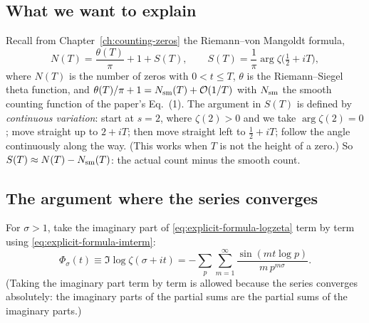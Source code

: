 \subsection{What we want to explain}

Recall from Chapter~\ref{ch:counting-zeros} the Riemann--von Mangoldt formula,
\begin{equation}
N(T)=\frac{\theta(T)}{\pi}+1+S(T),\qquad S(T)=\frac{1}{\pi}\arg\zeta\bigl(\tfrac12+iT\bigr),
\label{eq:explicit-formula-rvm}
\end{equation}
where $N(T)$ is the number of zeros with $0<t\le T$, $\theta$ is the Riemann--Siegel theta function, and $\theta(T)/\pi+1=N_{\mathrm{sm}}(T)+\mathcal{O}(1/T)$ with $N_{\mathrm{sm}}$ the smooth counting function of the paper's Eq.~(1). The argument in $S(T)$ is defined by \emph{continuous variation}: start at $s=2$, where $\zeta(2)>0$ and we take $\arg\zeta(2)=0$; move straight up to $2+iT$; then move straight left to $\tfrac12+iT$; follow the angle continuously along the way. (This works when $T$ is not the height of a zero.) So $S(T)\approx N(T)-N_{\mathrm{sm}}(T)$: the actual count minus the smooth count.

\subsection{The argument where the series converges}

For $\sigma>1$, take the imaginary part of \cref{eq:explicit-formula-logzeta} term by term using \cref{eq:explicit-formula-imterm}:
\begin{equation}
\Phi_\sigma(t)\equiv\Im\log\zeta(\sigma+it)=-\sum_p\sum_{m=1}^{\infty}\frac{\sin(mt\log p)}{m\,p^{m\sigma}} .
\label{eq:explicit-formula-phi}
\end{equation}
(Taking the imaginary part term by term is allowed because the series converges absolutely: the imaginary parts of the partial sums are the partial sums of the imaginary parts.)

